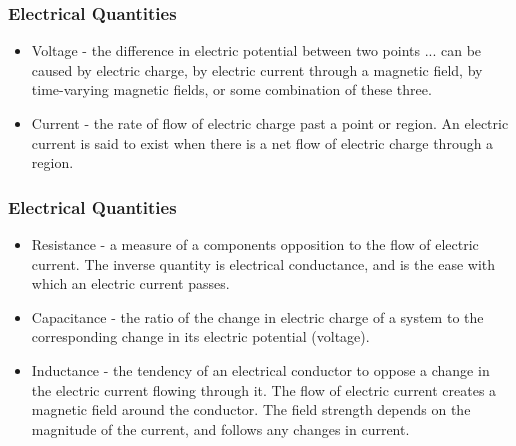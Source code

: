 \documentclass[fleqn]{beamer} %
\newcommand{\sectionIsubsectionIItitle}{Electrical Quantities}
\begin{document}
			\begin{frame}
				\frametitle{\sectionIsubsectionIItitle}

				\begin{itemize}

					
					\item {\PR Voltage} - the difference in electric potential between two points ... can be caused by electric charge, by electric current through a magnetic field, by time-varying magnetic fields, or some combination of these three.
					
					\item {\RD Current} - the rate of flow of electric charge past a point or region. An electric current is said to exist when there is a net flow of electric charge through a region.

				\end{itemize}	

			\end{frame}

			\begin{frame}
				\frametitle{\sectionIsubsectionIItitle}
				
				\begin{itemize}

					\item {\BL Resistance} - a measure of a components opposition to the flow of electric current. The inverse quantity is electrical conductance, and is the ease with which an electric current passes.  
							
					\item {\PR Capacitance} - the ratio of the change in electric charge of a system to the corresponding change in its electric potential (voltage).
					
					\item {\RD Inductance} - the tendency of an electrical conductor to oppose a change in the electric current flowing through it. The flow of electric current creates a magnetic field around the conductor. The field strength depends on the magnitude of the current, and follows any changes in current.

				\end{itemize}

			\end{frame}
\end{document}
